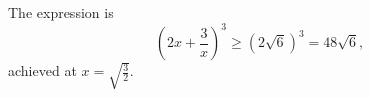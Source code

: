 The expression is \[\left(2x+\frac{3}{x}\right)^3\geq\left(2\sqrt{6}\right)^3=\boxed{48\sqrt{6}},\] achieved at $x=\sqrt{\frac{3}{2}}$.